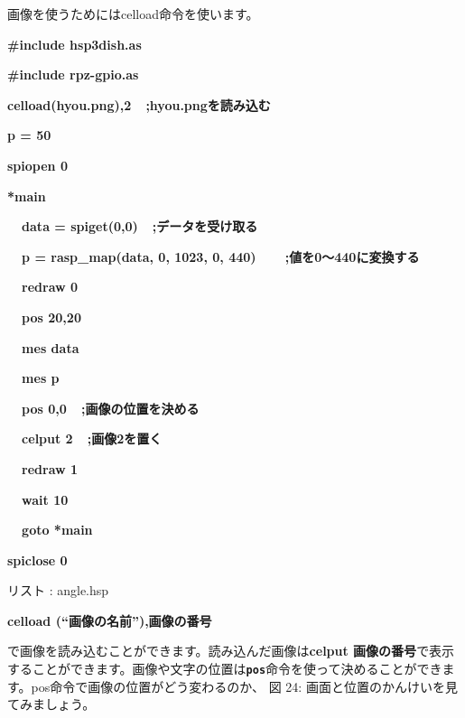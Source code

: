 \documentclass[a4paper,dvipdfmx]{jarticle}
\newcounter{List}
\renewcommand\theList{\arabic{List}}
\begin{document}
画像を使うためにはcelload命令を使います。

\centering
\begin{minipage}{17.006cm}
{\ttfamily\bfseries
\#include {\textquotedbl}hsp3dish.as{\textquotedbl}}

{\ttfamily\bfseries
\#include {\textquotedbl}rpz-gpio.as{\textquotedbl}}


\bigskip

{\ttfamily\bfseries
celload({\textquotedbl}hyou.png{\textquotedbl}),2\ \ \textcolor[rgb]{0.0,0.0,0.6}{;hyou.pngを読み込む}}

{\ttfamily\bfseries
p = 50}


\bigskip

{\ttfamily\bfseries
spiopen 0}


\bigskip

{\ttfamily\bfseries
*main}

{\ttfamily\bfseries
\ \ data = spiget(0,0)\ \ \textcolor[rgb]{0.0,0.0,0.6}{;データを受け取る}}

{\ttfamily\bfseries
\ \ p = rasp\_map(data, 0, 1023, 0,
440)\ \ \ \ \textcolor[rgb]{0.0,0.0,0.6}{;値を0〜440に変換する}}


\bigskip

{\ttfamily\bfseries
\ \ redraw 0}

{\ttfamily\bfseries
\ \ pos 20,20}

{\ttfamily\bfseries
\ \ mes data}

{\ttfamily\bfseries
\ \ mes p}

{\ttfamily\bfseries
\ \ pos 0,0\ \ \textcolor[rgb]{0.0,0.0,0.6}{;画像の位置を決める}}

{\ttfamily\bfseries
\ \ celput 2\ \ \textcolor[rgb]{0.0,0.0,0.6}{;画像2を置く}}

{\ttfamily\bfseries
\ \ redraw 1}


\bigskip

{\ttfamily\bfseries
\ \ wait 10\ \ }

{\ttfamily\bfseries
\ \ goto *main}


\bigskip

{\ttfamily\bfseries
spiclose 0}

{\mdseries
リスト \stepcounter{List}{\theList}: angle.hsp}
\end{minipage}
{\bfseries
celload (``画像の名前''),画像の番号}

で画像を読み込むことができます。読み込んだ画像は\textbf{celput
画像の番号}で表示することができます。画像や文字の位置は\texttt{\textbf{pos}}命令を使って決めることができます。pos命令で画像の位置がどう変わるのか、
図 24:
画面と位置のかんけいを見てみましょう。
\end{document}
